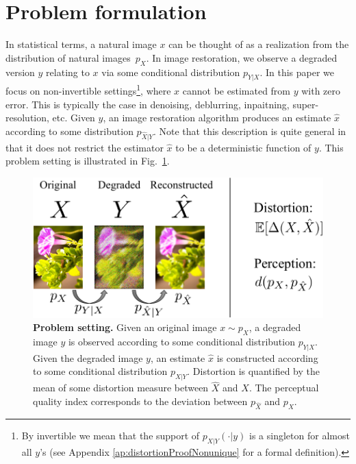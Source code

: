 \section{Problem formulation}\label{sec:perceptionDistortion}

In statistical terms, a natural image $x$ can be thought of as a realization from the distribution of natural images~$p_X$. In image restoration, we observe a degraded version $y$ relating to $x$ via some conditional distribution $p_{Y \vert X}$. In this paper we focus on non-invertible settings\footnote{\label{foot:invertible}By invertible we mean that the support of $p_{X|Y}(\cdot|y)$ is a singleton for almost all $y$'s (see Appendix \ref{ap:distortionProofNonunique} for a formal definition).}, where $x$ cannot be estimated from $y$ with zero error. This is typically the case in denoising, deblurring, inpaitning, super-resolution, etc. Given $y$, an image restoration algorithm produces an estimate $\hat{x}$ according to some distribution $p_{\hat{X}\vert Y}$. Note that this description is quite general in that it does not restrict the estimator $\hat{x}$ to be a deterministic function of $y$. This problem setting is illustrated in Fig.~\ref{fig:problemSetting}.

\begin{figure}
	\begin{center}
		\includegraphics[width=0.9\linewidth]{figures/problemSetting3.pdf}
	\end{center}
	\caption{\textbf{Problem setting.} Given an original image $x\sim p_X$, a degraded image $y$ is observed according to some conditional distribution $p_{Y \vert X}$. Given the degraded image $y$, an estimate $\hat{x}$ is constructed according to some conditional distribution $p_{\hat{X} \vert Y}$. Distortion is quantified by the mean of some distortion measure between $\hat{X}$ and $X$. The perceptual quality index corresponds to the deviation between $p_{\hat{X}}$ and $p_X$.}
	\label{fig:problemSetting}
\end{figure}


